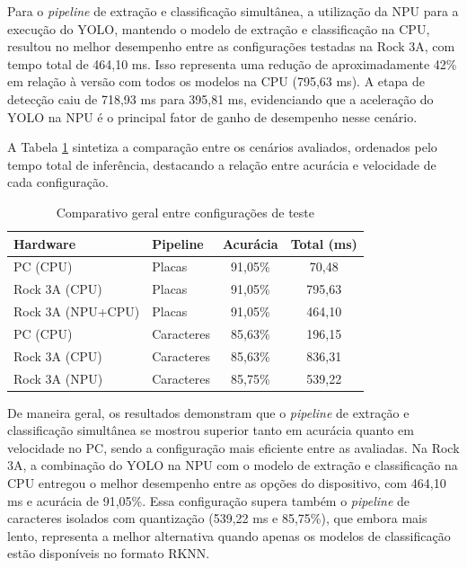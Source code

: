 Para o \textit{pipeline} de extração e classificação simultânea, a utilização da NPU para a execução do YOLO, mantendo o modelo de extração e classificação na CPU, resultou no melhor desempenho entre as configurações testadas na Rock 3A, com tempo total de 464,10 ms. Isso representa uma redução de aproximadamente 42\% em relação à versão com todos os modelos na CPU (795,63 ms). A etapa de detecção caiu de 718,93 ms para 395,81 ms, evidenciando que a aceleração do YOLO na NPU é o principal fator de ganho de desempenho nesse cenário.

A Tabela \ref{tab:comparativo} sintetiza a comparação entre os cenários avaliados, ordenados pelo tempo total de inferência, destacando a relação entre acurácia e velocidade de cada configuração.

\begin{table}[H] 
\centering \caption{Comparativo geral entre configurações de teste} 
\label{tab:comparativo} 
\begin{tabular}{llcc} \hline 
\textbf{Hardware} & \textbf{Pipeline} & \textbf{Acurácia} & \textbf{Total (ms)} \\ \hline 
PC (CPU)           & Placas     & 91,05\% &  70,48 \\ 
Rock 3A (CPU)      & Placas     & 91,05\% & 795,63 \\
Rock 3A (NPU+CPU)  & Placas     & 91,05\% & 464,10 \\ \hline
PC (CPU)           & Caracteres          & 85,63\% & 196,15 \\ 
Rock 3A (CPU)      & Caracteres          & 85,63\% & 836,31 \\
Rock 3A (NPU)      & Caracteres & 85,75\% & 539,22 \\ \hline
\end{tabular} 
\end{table}

De maneira geral, os resultados demonstram que o \textit{pipeline} de extração e classificação simultânea se mostrou superior tanto em acurácia quanto em velocidade no PC, sendo a configuração mais eficiente entre as avaliadas. Na Rock 3A, a combinação do YOLO na NPU com o modelo de extração e classificação na CPU entregou o melhor desempenho entre as opções do dispositivo, com 464,10 ms e acurácia de 91,05\%. Essa configuração supera também o \textit{pipeline} de caracteres isolados com quantização (539,22 ms e 85,75\%), que embora mais lento, representa a melhor alternativa quando apenas os modelos de classificação estão disponíveis no formato RKNN.